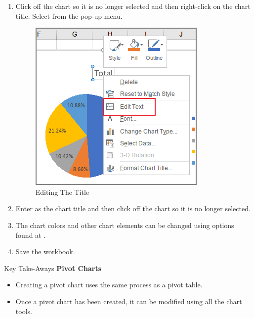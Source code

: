 \begin{enumbox}
\begin{enumerate}
		\item Click off the chart so it is no longer selected and then right-click on the chart title. Select  from the pop-up menu.

		\begin{figure}[H]
			\centering
			\includegraphics[width=\maxwidth{.75\linewidth}]{gfx/ch07_fig32}
			\caption{Editing The Title}
			\label{07:fig32}
		\end{figure}

		\item Enter  as the chart title and then click off the chart so it is no longer selected.
		\item The chart colors and other chart elements can be changed using options found at .
		\item Save the  workbook.
	\end{enumerate}
\end{enumbox}

\begin{center}
	\begin{tkwbox}{Key Take-Aways}
		\textbf{Pivot Charts}
		\\
		\begin{itemize}
			\setlength{\itemsep}{0pt}
			\setlength{\parskip}{0pt}
			\setlength{\parsep}{0pt}
			
			\item Creating a pivot chart uses the same process as a pivot table.
			\item Once a pivot chart has been created, it can be modified using all the chart tools.
			
		\end{itemize}
	\end{tkwbox}
\end{center}

